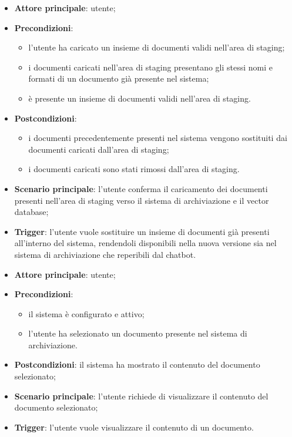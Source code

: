 \documentclass[10pt, a4paper]{article}
\begin{document}
    \begin{itemize}
        \item \textbf{Attore principale}: utente;
        \item \textbf{Precondizioni}:
            \begin{itemize}
                \item l’utente ha caricato un insieme di documenti validi nell’area di staging;
                \item i documenti caricati nell'area di staging presentano gli stessi nomi e formati di un documento già presente nel sistema;
                \item è presente un insieme di documenti validi nell’area di staging.
            \end{itemize}
        \item \textbf{Postcondizioni}:
            \begin{itemize}
                \item i documenti precedentemente presenti nel sistema vengono sostituiti dai documenti caricati dall'area di staging;
                \item i documenti caricati sono stati rimossi dall’area di staging.
            \end{itemize}
        \item \textbf{Scenario principale}: l’utente conferma il caricamento dei documenti presenti nell'area di staging verso il sistema di archiviazione e il vector database;
        \item \textbf{Trigger}: l’utente vuole sostituire un insieme di documenti già presenti all'interno del sistema, rendendoli disponibili nella nuova versione sia nel sistema di archiviazione che reperibili dal chatbot.
    \end{itemize}
    

    \begin{itemize}
        \item \textbf{Attore principale}: utente;
        \item \textbf{Precondizioni}:
        \begin{itemize}
            \item il sistema è configurato e attivo;
            \item l’utente ha selezionato un documento presente nel sistema di archiviazione.
        \end{itemize}
        \item \textbf{Postcondizioni}: il sistema ha mostrato il contenuto del documento selezionato;
        \item \textbf{Scenario principale}: l’utente richiede di visualizzare il contenuto del documento selezionato;
        \item \textbf{Trigger}: l’utente vuole visualizzare il contenuto di un documento.
    \end{itemize}
\end{document}

